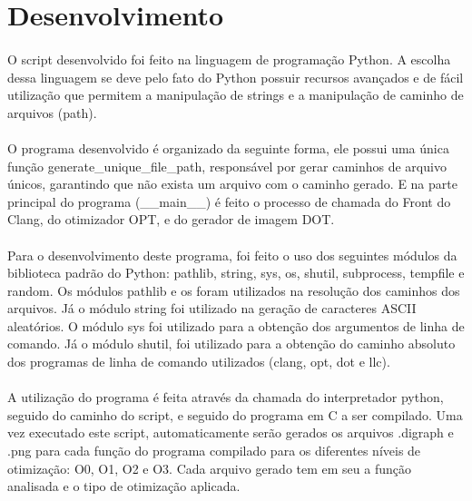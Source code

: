 \documentclass[12pt]{article}
\begin{document}
\section{Desenvolvimento}

\paragraph{}O script desenvolvido foi feito na linguagem de programação Python. A escolha dessa linguagem se deve pelo fato do Python possuir recursos avançados e de fácil utilização que permitem a manipulação de strings e a manipulação de caminho de arquivos (path).

\paragraph{}O programa desenvolvido é organizado da seguinte forma, ele possui uma única função generate\_unique\_file\_path, responsável por gerar caminhos de arquivo únicos, garantindo que não exista um arquivo com o caminho gerado. E na parte principal do programa (\_\_main\_\_) é feito o processo de chamada do Front do Clang, do otimizador OPT, e do gerador de imagem DOT.

\paragraph{}Para o desenvolvimento deste programa, foi feito o uso dos seguintes módulos da biblioteca padrão do Python: pathlib, string, sys, os, shutil, subprocess, tempfile e random. Os módulos pathlib e os foram utilizados na resolução dos caminhos dos arquivos. Já o módulo string foi utilizado na geração de caracteres ASCII aleatórios. O módulo sys foi utilizado para a obtenção dos argumentos de linha de comando. Já o módulo shutil, foi utilizado para a obtenção do caminho absoluto dos programas de linha de comando utilizados (clang, opt, dot e llc).

\paragraph{}A utilização do programa é feita através da chamada do interpretador python, seguido do caminho do script, e seguido do programa em C a ser compilado. Uma vez executado este script, automaticamente serão gerados os arquivos .digraph e .png para cada função do programa compilado para os diferentes níveis de otimização: O0, O1, O2 e O3. Cada arquivo gerado tem em seu a função analisada e o tipo de otimização aplicada.
\end{document}
